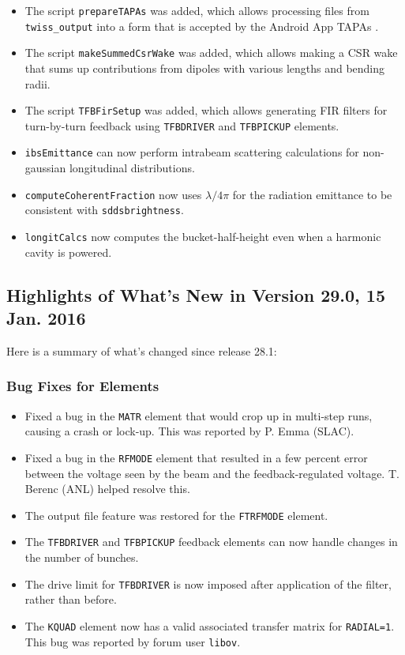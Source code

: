 \documentclass[11pt]{article}
\begin{document}
\begin{itemize}
\item The script \verb|prepareTAPAs| was added, which allows processing files from \verb|twiss_output| into a form
  that is accepted by the Android App TAPAs \cite{TAPAs}.
\item The script \verb|makeSummedCsrWake| was added, which allows making a CSR wake that sums up contributions from
  dipoles with various lengths and bending radii. 
\item The script \verb|TFBFirSetup| was added, which allows generating FIR filters for turn-by-turn feedback using 
  \verb|TFBDRIVER| and \verb|TFBPICKUP| elements.
\item \verb|ibsEmittance| can now perform intrabeam scattering calculations for non-gaussian longitudinal distributions.
\item \verb|computeCoherentFraction| now uses $\lambda/4\pi$ for the radiation emittance to be consistent with 
  \verb|sddsbrightness|.
\item \verb|longitCalcs| now computes the bucket-half-height even when a harmonic cavity is powered.
\end{itemize}

\subsection{Highlights of What's New in Version 29.0, 15 Jan. 2016}

Here is a summary of what's changed since release 28.1:

\subsubsection{Bug Fixes for Elements}

\begin{itemize}
\item Fixed a bug in the \verb|MATR| element that would crop up in multi-step runs, causing a crash or lock-up.
  This was reported by P. Emma (SLAC).
\item Fixed a bug in the \verb|RFMODE| element that resulted in a few percent error between the voltage seen by the beam and
  the feedback-regulated voltage. T. Berenc (ANL) helped resolve this.
\item The output file feature was restored for the \verb|FTRFMODE| element.
\item The \verb|TFBDRIVER| and \verb|TFBPICKUP| feedback elements can now handle changes in the number of bunches.
\item The drive limit for \verb|TFBDRIVER| is now imposed after application of the filter, rather than before.
\item The \verb|KQUAD| element now has a valid associated transfer matrix for \verb|RADIAL=1|. This bug was reported
  by forum user \verb|libov|.
\end{itemize}
\end{document}
